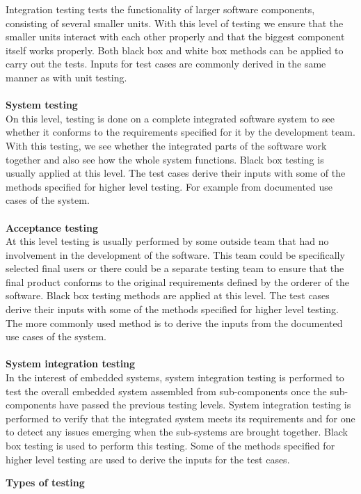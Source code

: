 \documentclass[english,12pt,a4paper,pdftex,elec,utf8]{aaltothesis}
\begin{document}
Integration testing tests the functionality of larger software components, consisting of several smaller units. With this level of testing we ensure that the smaller units interact with each other properly and that the biggest component itself works properly. Both black box and white box methods can be applied to carry out the tests. Inputs for test cases are commonly derived in the same manner as with unit testing.
\\
\\
\textbf{System testing}\\ 
On this level, testing is done on a complete integrated software system to see whether it conforms to the requirements specified for it by the development team. With this testing, we see whether the integrated parts of the software work together and also see how the whole system functions. Black box testing is usually applied at this level. The test cases derive their inputs with some of the methods specified for higher level testing. For example from documented use cases of the system.
\\
\\
\textbf{Acceptance testing}\\ 
At this level testing is usually performed by some outside team that had no involvement in the development of the software. This team could be specifically selected final users or there could be a separate testing team to ensure that the final product conforms to the original requirements defined by the orderer of the software. Black box testing methods are applied at this level. The test cases derive their inputs with some of the methods specified for higher level testing. The more commonly used method is to derive the inputs from the documented use cases of the system.
\\
\\
\textbf{System integration testing}\\
In the interest of embedded systems, system integration testing is performed to test the overall embedded system assembled from sub-components once the sub-components have passed the previous testing levels. System integration testing is performed to verify that the integrated system meets its requirements and for one to detect any issues emerging when the sub-systems are brought together. Black box testing is used to perform this testing. Some of the methods specified for higher level testing are used to derive the inputs for the test cases. \cite{embeddedsofteng, systinttesting1}\\
\begin{center}
\textbf{Types of testing}
\end{center}
\end{document}
